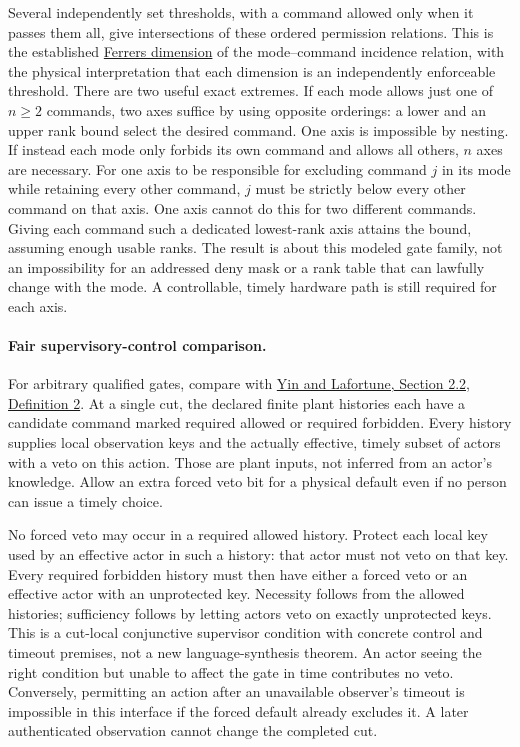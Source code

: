 \documentclass{article}
\begin{document}
Several independently set thresholds, with a command allowed only when it passes them all, give intersections of these ordered permission relations. This is the established \href{https://www.sciencedirect.com/science/article/pii/S0167506008708896}{Ferrers dimension} of the mode--command incidence relation, with the physical interpretation that each dimension is an independently enforceable threshold. There are two useful exact extremes. If each mode allows just one of \(n\ge2\) commands, two axes suffice by using opposite orderings: a lower and an upper rank bound select the desired command. One axis is impossible by nesting. If instead each mode only forbids its own command and allows all others, \(n\) axes are necessary. For one axis to be responsible for excluding command \(j\) in its mode while retaining every other command, \(j\) must be strictly below every other command on that axis. One axis cannot do this for two different commands. Giving each command such a dedicated lowest-rank axis attains the bound, assuming enough usable ranks. The result is about this modeled gate family, not an impossibility for an addressed deny mask or a rank table that can lawfully change with the mode. A controllable, timely hardware path is still required for each axis.

\paragraph{Fair supervisory-control comparison.}
For arbitrary qualified gates, compare with \href{https://xiangyin.sjtu.edu.cn/Paper/15Automatica.pdf}{Yin and Lafortune, Section 2.2, Definition 2}. At a single cut, the declared finite plant histories each have a candidate command marked required allowed or required forbidden. Every history supplies local observation keys and the actually effective, timely subset of actors with a veto on this action. Those are plant inputs, not inferred from an actor's knowledge. Allow an extra forced veto bit for a physical default even if no person can issue a timely choice.

No forced veto may occur in a required allowed history. Protect each local key used by an effective actor in such a history: that actor must not veto on that key. Every required forbidden history must then have either a forced veto or an effective actor with an unprotected key. Necessity follows from the allowed histories; sufficiency follows by letting actors veto on exactly unprotected keys. This is a cut-local conjunctive supervisor condition with concrete control and timeout premises, not a new language-synthesis theorem. An actor seeing the right condition but unable to affect the gate in time contributes no veto. Conversely, permitting an action after an unavailable observer's timeout is impossible in this interface if the forced default already excludes it. A later authenticated observation cannot change the completed cut.
\end{document}
